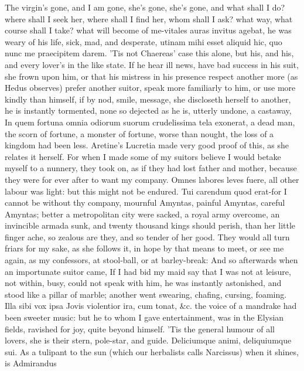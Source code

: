{The virgin's gone, and I am gone, she's gone, she's gone, and what
shall I do? where shall I seek her, where shall I find her, whom shall
I ask? what way, what course shall I take? what will become of
me-vitales auras invitus agebat, he was weary of his life, sick,
mad, and desperate, utinam mihi esset aliquid hic, quo nunc me
praecipitem darem. 'Tis not Chaereas' case this alone, but his, and
his, and every lover's in the like state. If he hear ill news, have bad
success in his suit, she frown upon him, or that his mistress in his
presence respect another more (as Hedus observes) prefer another
suitor, speak more familiarly to him, or use more kindly than himself,
if by nod, smile, message, she discloseth herself to another, he is
instantly tormented, none so dejected as he is, utterly undone, a
castaway, In quem fortuna omnia odiorum suorum crudelissima tela
exonerat, a dead man, the scorn of fortune, a monster of fortune, worse
than nought, the loss of a kingdom had been less. Aretine's
Lucretia made very good proof of this, as she relates it herself. For
when I made some of my suitors believe I would betake myself to a
nunnery, they took on, as if they had lost father and mother, because
they were for ever after to want my company. Omnes labores leves fuere,
all other labour was light: but this might not be endured. Tui
carendum quod erat-for I cannot be without thy company, mournful
Amyntas, painful Amyntas, careful Amyntas; better a metropolitan city
were sacked, a royal army overcome, an invincible armada sunk, and
twenty thousand kings should perish, than her little finger ache, so
zealous are they, and so tender of her good. They would all turn friars
for my sake, as she follows it, in hope by that means to meet, or see
me again, as my confessors, at stool-ball, or at barley-break: And so
afterwards when an importunate suitor came, If I had bid my maid
say that I was not at leisure, not within, busy, could not speak with
him, he was instantly astonished, and stood like a pillar of marble;
another went swearing, chafing, cursing, foaming. Illa sibi vox
ipsa Jovis violentior ira, cum tonat, \&c. the voice of a mandrake had
been sweeter music: but he to whom I gave entertainment, was in the
Elysian fields, ravished for joy, quite beyond himself. 'Tis the
general humour of all lovers, she is their stern, pole-star, and guide.
Deliciumque animi, deliquiumque sui. As a tulipant to the sun
(which our herbalists calls Narcissus) when it shines, is Admirandus
}
